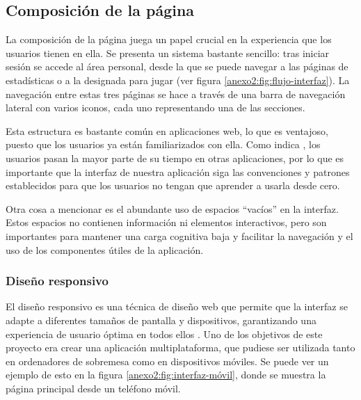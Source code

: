 \subsection{Composición de la página}
La composición de la página juega un papel crucial en la experiencia que los
usuarios tienen en ella. Se presenta un sistema bastante sencillo: tras iniciar
sesión se accede al área personal, desde la que se puede navegar a las páginas
de estadísticas o a la designada para jugar (ver figura
\ref{anexo2:fig:flujo-interfaz}). La navegación entre estas tres páginas se hace
a través de una barra de navegación lateral con varios iconos, cada uno
representando una de las secciones.


Esta estructura es bastante común en aplicaciones web, lo que es ventajoso,
puesto que los usuarios ya están familiarizados con ella. Como indica
\textcite{Nielsen2018Jan}, los usuarios pasan la mayor parte de su tiempo en
otras aplicaciones, por lo que es importante que la interfaz de nuestra
aplicación siga las convenciones y patrones establecidos para que los usuarios
no tengan que aprender a usarla desde cero.

Otra cosa a mencionar es el abundante uso de espacios \enquote{vacíos} en la
interfaz\footnotemark. Estos espacios no contienen información ni elementos
interactivos, pero son importantes para mantener una carga cognitiva baja y
facilitar la navegación y el uso de los componentes útiles de la aplicación.


\subsubsection{Diseño responsivo}
El diseño responsivo es una técnica de diseño web que permite que la interfaz se
adapte a diferentes tamaños de pantalla y dispositivos, garantizando una experiencia
de usuario óptima en todos ellos \parencite{ResponsiveWebDesign2019}. Uno de los objetivos
de este proyecto era crear una aplicación multiplataforma, que pudiese ser utilizada
tanto en ordenadores de sobremesa como en dispositivos móviles\footnotemark. Se puede
ver un ejemplo de esto en la figura \ref{anexo2:fig:interfaz-móvil}, donde se muestra
la página principal desde un teléfono móvil.

